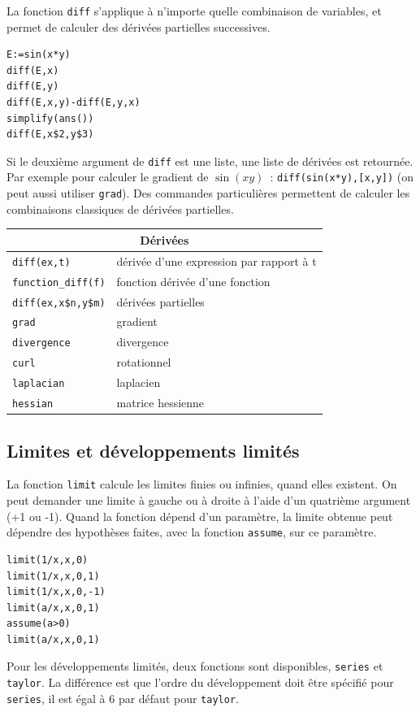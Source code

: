 \documentclass{article}
\begin{document}
La fonction \verb|diff| s'applique \`a n'importe quelle combinaison de
variables, et permet de calculer des d\'eriv\'ees partielles
successives.
\begin{verbatim}
E:=sin(x*y)
diff(E,x)
diff(E,y)
diff(E,x,y)-diff(E,y,x)
simplify(ans())
diff(E,x$2,y$3)
\end{verbatim}
Si le deuxi\`eme argument de \verb|diff| est une liste, une
liste de d\'eriv\'ees est retourn\'ee. Par exemple pour calculer
le gradient de $\sin(xy)$~:
\verb|diff(sin(x*y),[x,y])| (on peut aussi utiliser \verb|grad|). 
Des commandes particuli\`eres permettent de calculer les  
combinaisons classiques de d\'eriv\'ees partielles.

\begin{center}
\begin{tabular}{|ll|}
\hline
\multicolumn{2}{|c|}{\bf D\'eriv\'ees}\\
\hline\hline
\verb|diff(ex,t)| &d\'eriv\'ee d'une expression par rapport \`a t\\
\verb|function_diff(f)| & fonction d\'eriv\'ee d'une fonction\\
\verb|diff(ex,x$n,y$m)| & d\'eriv\'ees partielles\\
\verb|grad| & gradient\\ 
\verb|divergence| & divergence\\
\verb|curl| & rotationnel\\
\verb|laplacian| & laplacien\\
\verb|hessian| & matrice hessienne\\
\hline
\end{tabular}
\end{center}
%
\subsection{Limites et d\'eveloppements limit\'es}
%
La fonction  \verb|limit| calcule les limites finies ou
infinies, quand elles existent. On peut demander une limite 
\`a gauche ou \`a droite \`a l'aide d'un quatri\`eme argument (+1 ou -1). 
Quand la fonction d\'epend d'un
param\`etre, la limite obtenue peut d\'ependre des hypoth\`eses
faites, avec la fonction {\tt assume}, sur ce param\`etre. 
\begin{verbatim}
limit(1/x,x,0)
limit(1/x,x,0,1)
limit(1/x,x,0,-1)
limit(a/x,x,0,1)
assume(a>0)
limit(a/x,x,0,1)
\end{verbatim}
Pour les d\'eveloppements limit\'es,
deux fonctions sont disponibles, \verb|series| et \verb|taylor|. La
diff\'erence est que l'ordre du d\'eveloppement doit \^etre
sp\'ecifi\'e pour \verb|series|, il est \'egal \`a 6 par d\'efaut
pour \verb|taylor|. 
\end{document}
